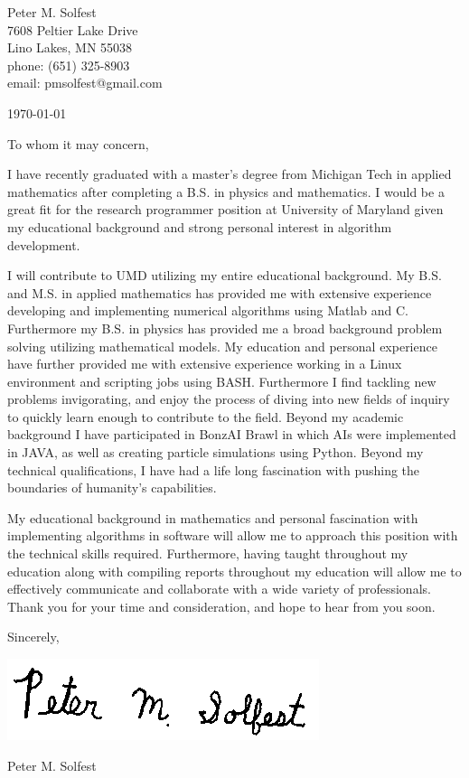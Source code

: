 \documentclass[letterpaper,12pt]{article}
\begin{document}
Peter M. Solfest\\
7608 Peltier Lake Drive\\
Lino Lakes, MN 55038\\
phone: (651) 325-8903\\
email: pmsolfest@gmail.com

\today

To whom it may concern,

I have recently graduated with a master's degree from Michigan Tech in applied mathematics after
completing a B.S. in physics and mathematics.
I would be a great fit for the research programmer position
at University of Maryland given my educational background
and strong personal interest in algorithm development.

I will contribute to UMD utilizing my entire educational background.
My B.S. and M.S. in applied mathematics has provided me with extensive experience developing
and implementing numerical algorithms using Matlab and C.
Furthermore my B.S. in physics has provided me a broad background
problem solving utilizing mathematical models.
My education and personal experience have further provided me with
extensive experience working in a Linux environment and scripting
jobs using BASH.
Furthermore I find tackling new problems invigorating, and enjoy
the process of diving into new fields of inquiry to quickly learn
enough to contribute to the field.
Beyond my academic background I have participated in BonzAI Brawl in which
AIs were implemented in JAVA, as well as
creating particle simulations using Python.
%
Beyond my technical qualifications, I have had a life long fascination with
pushing the boundaries of humanity's capabilities.

My educational background in mathematics and personal fascination
with implementing algorithms in software will allow 
me to approach this position with the technical skills required.
Furthermore, having taught throughout my education along with compiling reports
throughout my education will allow me to effectively communicate and
collaborate with a wide variety of professionals.
Thank you for your time and consideration, and hope to hear from you soon.


Sincerely,

\includegraphics[height=.5in]{signature.png}

Peter M. Solfest
\end{document}
